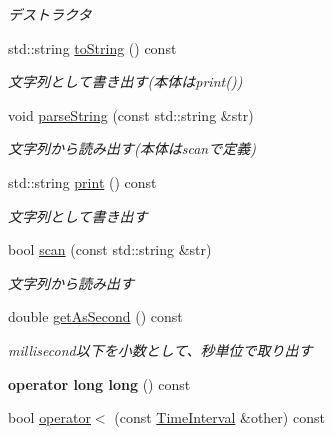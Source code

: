 \begin{DoxyCompactItemize}
\begin{DoxyCompactList}\small\item\em デストラクタ \end{DoxyCompactList}\item 
std\+::string \hyperlink{classskl_1_1_time_interval_a371c857881c27d68bff36e169646126a}{to\+String} () const
\begin{DoxyCompactList}\small\item\em 文字列として書き出す(本体はprint()) \end{DoxyCompactList}\item 
void \hyperlink{classskl_1_1_time_interval_ae706d4ce4795c566ce481f96380a878f}{parse\+String} (const std\+::string \&str)
\begin{DoxyCompactList}\small\item\em 文字列から読み出す(本体はscanで定義) \end{DoxyCompactList}\item 
std\+::string \hyperlink{classskl_1_1_time_interval_a1605c779683229ccc9e714f651ab3b1d}{print} () const
\begin{DoxyCompactList}\small\item\em 文字列として書き出す \end{DoxyCompactList}\item 
bool \hyperlink{classskl_1_1_time_interval_ac2ad9a1a830ce70e6702969815ca7468}{scan} (const std\+::string \&str)
\begin{DoxyCompactList}\small\item\em 文字列から読み出す \end{DoxyCompactList}\item 
double \hyperlink{classskl_1_1_time_interval_afa1dd3e11159f1f8886e83db1c11eb5a}{get\+As\+Second} () const
\begin{DoxyCompactList}\small\item\em millisecond以下を小数として、秒単位で取り出す \end{DoxyCompactList}\item 
\hypertarget{classskl_1_1_time_interval_a7b1ae87caad5ec9346f4c93415e3574f}{}\label{classskl_1_1_time_interval_a7b1ae87caad5ec9346f4c93415e3574f} 
{\bfseries operator long long} () const
\item 
\hypertarget{classskl_1_1_time_interval_a50850c985e918e73c2e189cd7666fa1d}{}\label{classskl_1_1_time_interval_a50850c985e918e73c2e189cd7666fa1d} 
bool \hyperlink{classskl_1_1_time_interval_a50850c985e918e73c2e189cd7666fa1d}{operator$<$} (const \hyperlink{classskl_1_1_time_interval}{Time\+Interval} \&other) const

\end{DoxyCompactItemize}
